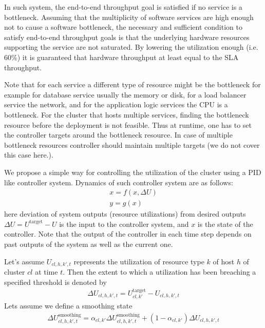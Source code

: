  
  
    In such system, the end-to-end throughput goal is satisfied if no service is a bottleneck.  Assuming that the multiplicity of software services are high enough not to cause a software bottleneck, the necessary and sufficient condition to satisfy end-to-end throughput goals is that the underlying hardware resources supporting the service are not saturated. By lowering the utilization enough (i.e. 60\%) it is guaranteed that hardware throughput at least equal to the SLA throughput.   
    
    Note that for each service a different type of resource might be the bottleneck for example for database service usually the memory or disk, for a load balancer service the network, and for the application logic services the CPU is a bottleneck. 
     For the cluster that hosts multiple services, finding the bottleneck resource before the deployment is not feasible. Thus at runtime, one has to set the controller targets around the bottleneck resource. In case of multiple bottleneck resources controller should maintain multiple targets (we do not cover this case here.).  
   
         We propose a simple way for controlling the utilization of the cluster using a PID like controller system. Dynamics of such controller system are as follows: 
         \begin{align} 
              x=f(x,\Delta U) \\ 
              y=g(x)
           \end{align}    
  here deviation of system outputs (resource utilizations)  from desired outputs $\Delta U=U^{\text{target}}-U$  is the input to the controller system, and $x$ is the state of the controller.  Note that the output of the controller in each time step depends on past outputs of the system as well as the current one.  
  
   Let's assume $U_{cl,h,k',t}$  represents the utilization of resource type $k$ of host $h$  of cluster $cl$ at time $t$. Then the extent to which a utilization has been breaching a specified threshold is denoted by
    \begin{align}  
      \Delta U_{cl,h,k',t}=U^\text{target}_{cl,k'}-U_{cl,h,k',t}
    \end{align} 
  Lets assume we define a smoothing state 
  \begin{align}  
   \Delta U^\text{smoothing}_{cl,h,k',t} = \alpha_{cl,k'} \Delta U^\text{smoothing}_{cl,h,k',t}+(1-\alpha_{cl,k'})\Delta U_{cl,h,k',t}   
   \end{align} 


